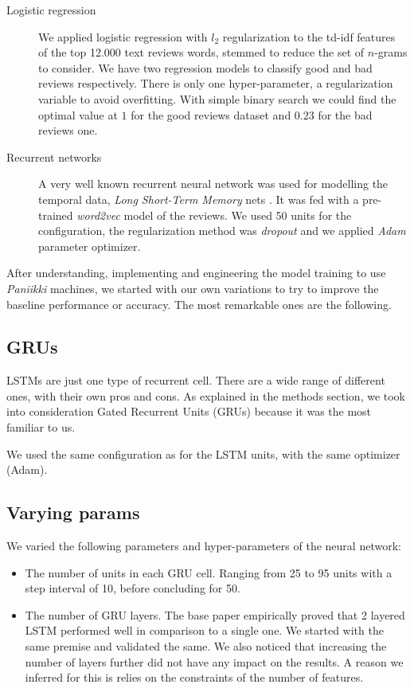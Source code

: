 \documentclass[a4paper,11pt]{article}
\begin{document}
\begin{description}
	\item[Logistic regression] We applied logistic regression with $l_2$ regularization to the td-idf features of the top 12.000 text reviews words, stemmed to reduce the set of $n$-grams to consider. We have two regression models to classify good and bad reviews respectively. There is only one hyper-parameter, a regularization variable to avoid overfitting. With simple binary search we could find the optimal value at $1$ for the good reviews dataset and $0.23$ for the bad reviews one.
	
	\item[Recurrent networks] A very well known recurrent neural network was used for modelling the temporal data, \textit{Long Short-Term Memory} nets \cite{Hochreiter:1997:LSM:1246443.1246450}. It was fed with a pre-trained \textit{word2vec} model of the reviews. We used 50 units for the configuration, the regularization method was \textit{dropout} and we applied \textit{Adam} \cite{adam:DBLP:journals/corr/KingmaB14} parameter optimizer.
\end{description}

After understanding, implementing and engineering the model training to use \textit{Paniikki} machines, we started with our own variations to try to improve the baseline performance or accuracy. The most remarkable ones are the following.

\subsection{GRUs}
LSTMs are just one type of recurrent cell. There are a wide range of different ones, with their own pros and cons. As explained in the methods section, we took into consideration Gated Recurrent Units \cite{gru:DBLP:journals/corr/ChungGCB14} (GRUs) because it was the most familiar to us.

We used the same configuration as for the LSTM units, with the same optimizer (Adam).

\subsection{Varying params}
We varied the following parameters and hyper-parameters of the neural network:
\begin{itemize}
	\item The number of units in each GRU cell. Ranging from 25 to 95 units with a step interval of 10, before concluding for 50.
	\item The number of GRU layers. The base paper empirically proved that 2 layered LSTM performed well in comparison to a single one. We started with the same premise and validated the same. We also noticed that increasing the number of layers further did not have any impact on the results. A reason we inferred for this is relies on the constraints of the number of features.
\end{itemize}
\end{document}
